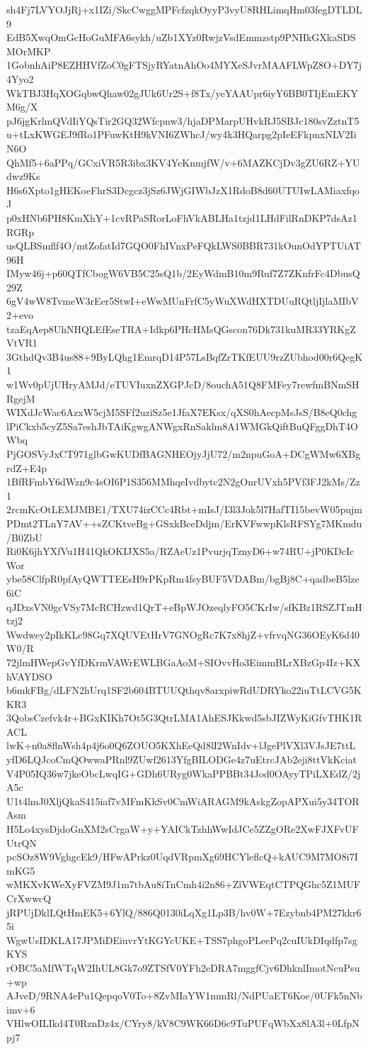 sh4Fj7LVYOJjRj+x1IZi/SkcCwggMPFcfzqkOyyP3vyU8RHLimqHm03fegDTLDL9
EdB5XwqOmGcHoGuMFA6sykh/uZb1XYz0RwjzVsdEmmzstp9PNHkGXkaSDSMOrMKP
1GobnhAiP8EZHHVfZoC0gFTSjyRYatnAhOo4MYXeSJvrMAAFLWpZ8O+DY7j4Yyo2
WkTBJ3HqXOGqbwQhaw02gJUk6Ur2S+f8Tx/yeYAAUpr6iyY6BB0TIjEmEKYM6g/X
pJ6jgKrlmQVdIiYQsTir2GQ32Wfcpnw3/hjaDPMarpUHvkRJ5SBJc180svZztnT5
u+tLxKWGEJ9fRo1PFuwKtH9kVNI6ZWhcJ/wy4k3HQarpg2pIeEFkpnxNLV2IiN6O
QhMf5+6aPPq/GCxiVR5R3ibx3KV4YeKnmjfW/v+6MAZKCjDv3gZU6RZ+YUdwz9Ks
H6s6Xpto1gHEKoeFhrS3Dcgcz3jSz6JWjGIWbJzX1RdoB8d60UTUIwLAMiaxfqoJ
p0xHNb6PH8KmXhY+1cvRPaSRorLoFhVkABLHa1tzjd1LHdFilRnDKP7dsAz1RGRp
usQLBSmflf4O/mtZofatId7GQO0FhIVnxPeFQkLWS0BBR731kOunOdYPTUiAT96H
IMyw46j+p60QTfCbogW6VB5C25sQ1b/2EyWdmB10m9Ruf7Z7ZKnfrFc4DbusQ29Z
6gV4wW8TvmeW3rEer5StwI+eWwMUnFrfC5yWuXWdHXTDUuRQtljIjlaMIbV2+evo
tzaEqAep8UhNHQLEfEseTRA+Idkp6PHcHMsQGscon76Dk731kuMR33YRKgZVtVR1
3GthdQv3B4us88+9ByLQhg1EmrqD14P57LsBqfZrTKfEUU9rzZUbhod00r6QegK1
w1Wv0pUjUHryAMJd/eTUVIuxnZXGPJcD/8ouchA51Q8FMFey7rewfmBNmSHRgejM
WIXdJcWac6AzxW5cjM5SFf2uziSz5e1JfaX7EKsx/qXS0hAecpMsJsS/B8eQ0chg
lPiCkxb5cyZ5Sa7eshJbTAiKgwgANWgxRnSaklm8A1WMGkQiftBuQFggDhT4OWbq
PjGOSVyJxCT971glbGwKUDfBAGNHEOjyJjU72/m2npuGoA+DCgWMw6XBgrdZ+E4p
1BfRFmbY6dWzn9c4sOI6P1S356MMhqeIvdbytc2N2gOnrUVxh5PVf3FJ2kMs/Zz1
2rcmKcOtLEMJMBE1/TXU74izCCc4Rbt+mIsJ/I3l3Jok5l7HafTI15bevW05pujm
PDmt2TLnY7AV++sZCKtveBg+GSxkBceDdjm/ErKVFwwpKlsRFSYg7MKmdu/B0ZbU
Ri0K6jhYXfVu1H41QkOKIJXS5a/RZAeUz1PvurjqTznyD6+w74RU+jP0KDcIcWor
ybe58ClfpR0pfAyQWTTEEsH9rPKpRm4fsyBUF5VDABm/bgBj8C+qadbeB5lze6iC
qJDxsVN0gcVSy7McRCHzwd1QrT+eBpWJOzeqlyFO5CKrIw/sfKBz1RSZJTmHtzj2
Wwdwey2pIkKLc98Gq7XQUVEtHrV7GNOgRc7K7x8hjZ+vfrvqNG36OEyK6d40W0/R
72jlmHWepGvYfDKrmVAWrEWLBGaAoM+SIOvvHo3EimmBLrXBzGp4Iz+KXhVAYDSO
b6mkFBg/dLFN2hUrq1SF2b604BTUUQthqv8arxpiwRdUDRYko22iuTtLCVG5KKR3
3QobsCzefvk4r+BGxKIKh7Ot5G3QtrLMA1AhESJKkwd5sbJIZWyKiGfvTHK1RACL
lwK+n0a8flnWsh4p4j6o0Q6ZOUO5KXhEeQd8lI2WnIdv+lJgePlVXl3VJsJE7ttL
yfD6LQJcoCmQOwwaPRnl9ZUwf2613YfgBILODGe4z7uEtrcJAb2eji8ttVkKciat
V4P05IQ36w7jkeObcLwqIG+GDh6URyg0WkaPPBBt34Jod0OAyyTPiLXEdZ/2jA5c
U1t4lmJ0XljQkaS415iaf7vMFmKkSv0CmWiARAGM9kAskgZopAPXui5y34TORAsm
H5Lo4xysDjdoGnXM2sCrgaW+y+YAICkTzhhWwIdJCe5ZZgORe2XwFJXFvUFUtrQN
pcSOz8W9VghgcEk9/HFwAPrkz0UqdVRpmXg69HCYleflcQ+kAUC9M7MO8i7ImKG5
wMKXvKWeXyFVZM9J1m7tbAu8iTnCmh4i2n86+ZlVWEqtCTPQGhc5Z1MUFCrXwwcQ
jRPUjDklLQtHmEK5+6YlQ/886Q0130iLqXg1Lp3B/hv0W+7Ezybnb4PM27kkr65i
WgwUsIDKLA17JPMiDEiuvrYtKGYcUKE+TSS7phgoPLeePq2cuIUkDIqdfp7sgKYS
rOBC5aMfWTqW2IhUL8Gk7o9ZTSfV0YFh2eDRA7mggfCjv6DhknlImotNcuPsu+wp
AJveD/9RNA4ePu1QepqoV0To+8ZvMIaYW1mmRl/NdPUaET6Koe/0UFk5nNbimv+6
VHlwOILIkd4T0RznDz4x/CYry8/kV8C9WK66D6c9TuPUFqWbXx8lA3l+0LfpNpj7
